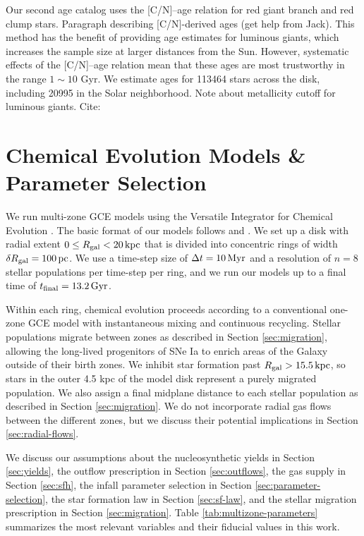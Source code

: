 \documentclass[twocolumn,twocolappendix,linenumbers]{aastex631}
\newcommand{\todo}[1]{{\color{red}#1}}
\newcommand{\kpc}{\,{\rm kpc}}
\begin{document}
Our second age catalog uses the [C/N]--age relation for red giant branch and red clump stars. 
\todo{Paragraph describing [C/N]-derived ages (get help from Jack).}
This method has the benefit of providing age estimates for luminous giants, which increases the sample size at larger distances from the Sun. However, systematic effects of the [C/N]--age relation mean that these ages are most trustworthy in the range $1\sim10$ Gyr. We estimate ages for \num{113464} stars across the disk, including \num{20995} in the Solar neighborhood.
\todo{Note about metallicity cutoff for luminous giants. Cite: \citet{cao_modeling_2025}}

\section{Chemical Evolution Models \& Parameter Selection}
\label{sec:methods}

We run multi-zone GCE models using the Versatile Integrator for Chemical Evolution \citep[{\tt VICE};][]{johnson_impact_2020}. The basic format of our models follows \citet{johnson_stellar_2021} and \citet{dubay_galactic_2024}. We set up a disk with radial extent $0\leq R_{\rm gal}<20\kpc$ that is divided into concentric rings of width $\delta R_{\rm gal}=100\,{\rm pc}$. We use a time-step size of $\Delta t=10\,{\rm Myr}$ and a resolution of $n=8$ stellar populations per time-step per ring, and we run our models up to a final time of $t_{\rm final}=13.2\,{\rm Gyr}$.

Within each ring, chemical evolution proceeds according to a conventional one-zone GCE model with instantaneous mixing and continuous recycling. Stellar populations migrate between zones as described in Section \ref{sec:migration}, allowing the long-lived progenitors of SNe Ia to enrich areas of the Galaxy outside of their birth zones. We inhibit star formation past $R_{\rm gal}>15.5\kpc$, so stars in the outer 4.5 kpc of the model disk represent a purely migrated population. We also assign a final midplane distance to each stellar population as described in Section \ref{sec:migration}. We do not incorporate radial gas flows between the different zones, but we discuss their potential implications in Section \ref{sec:radial-flows}.

We discuss our assumptions about the nucleosynthetic yields in Section \ref{sec:yields}, the outflow prescription in Section \ref{sec:outflows}, the gas supply in Section \ref{sec:sfh}, the infall parameter selection in Section \ref{sec:parameter-selection}, the star formation law in Section \ref{sec:sf-law}, and the stellar migration prescription in Section \ref{sec:migration}. Table \ref{tab:multizone-parameters} summarizes the most relevant variables and their fiducial values in this work.
\end{document}
